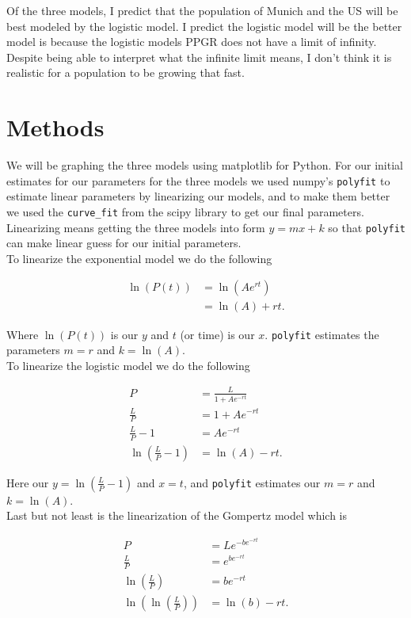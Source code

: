 \documentclass[english]{article}
\newcommand{\pop}{population }
\begin{document}
Of the three models, I predict that the \pop of Munich and the US will be best modeled by the logistic model. I predict the logistic model will be the better model is because the logistic models PPGR does not have a limit of infinity. Despite being able to interpret what the infinite limit means, I don't think it is realistic for a \pop to be growing that fast.

\section{Methods}
We will be graphing the three models using matplotlib for Python. For our initial estimates for our parameters for the three models we used numpy's \verb|polyfit| to estimate linear parameters by linearizing our models, and to make them better we used the \verb|curve_fit| from the scipy library to get our final parameters. Linearizing means getting the three models into form $ y=mx+k $ so that \verb|polyfit| can make linear guess for our initial parameters.\\ 

To linearize the exponential model we do the following 

\begin{align*}
\ln(P(t))&=\ln(Ae^{rt})\\
&= \ln(A)+rt.
\end{align*}

Where $ \ln(P(t)) $ is our $ y $ and $ t $ (or time) is our $ x $. \verb|polyfit| estimates the parameters $ m=r $ and $ k=\ln(A) $.\\

To linearize the logistic model we do the following

\begin{align*}
P&=\frac{L}{1+Ae^{-rt}}\\
\frac{L}{P}&=1+Ae^{-rt}\\
\frac{L}{P}-1&=Ae^{-rt}\\
\ln\left(\frac{L}{P}-1\right)&=\ln(A)-rt.
\end{align*}

Here our $ y=\ln\left(\frac{L}{P}-1\right) $ and $ x=t $, and  \verb|polyfit| estimates our $ m=r $ and $ k=\ln(A) $.\\

Last but not least is the linearization of the Gompertz model which is

\begin{align*}
P&=Le^{-be^{-rt}}\\
\frac{L}{P}&=e^{be^{-rt}}\\
\ln\left(\frac{L}{P}\right)&=be^{-rt}\\
\ln\left(\ln\left(\frac{L}{P}\right)\right)&=\ln(b)-rt.
\end{align*}
\end{document}
